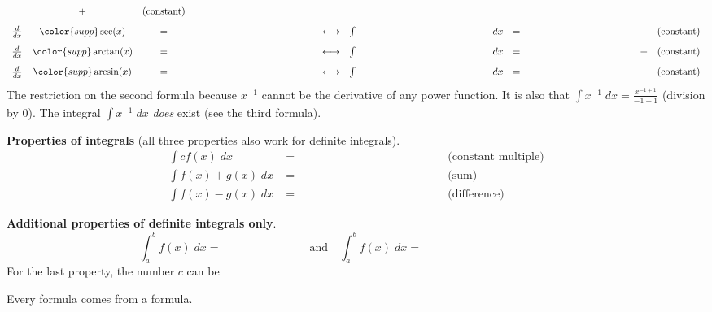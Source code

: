 \documentclass[../main.tex]{subfiles}
\begin{document}
\[\begin{array}{rcclcrclllcl}
                 &+& (\text{constant}) \\[2ex]
    \frac{d}{dx} & {\color{supp} \sec(x)} &=& \phantom{\color{main} \tan(x)\sec(x)}
                 & \longleftrightarrow 
                 & \int & \phantom{\color{main} \tan(x)\sec(x)} & dx &=& \phantom{\color{supp} \sec(x)} 
                 &+& (\text{constant}) \\[2ex]
    \frac{d}{dx} & {\color{supp} \arctan(x)} &=& \phantom{\color{main} \frac{1}{x^{2}+1}}
                 & \longleftrightarrow 
                 & \int & \phantom{\color{main} \frac{1}{x^{2} + 1}} & dx &=& \phantom{\color{supp} \arctan(x)} 
                 &+& (\text{constant}) \\[2ex]
    \frac{d}{dx} & {\color{supp} \arcsin(x)} &=& \phantom{\color{main} \frac{1}{\sqrt{1 - x^{2}}}}
                 & \longleftrightarrow 
                 & \int & \phantom{\color{main} \frac{1}{\sqrt{1 - x^{2}}}} & dx &=& \phantom{\color{supp} \arcsin(x)} 
                 &+& (\text{constant})
  \end{array}
\]
{\footnotesize \faExclamationTriangle{} The restriction  on the second formula  because \(x^{-1}\) cannot be the derivative of any power function. It is also  that \(\textstyle \int x^{-1} \;dx = \frac{x^{-1 + 1}}{-1 + 1}\) (division by \(0\)). The integral \(\textstyle \int x^{-1} \;dx\) \emph{does} exist (see the third formula).}

\textbf{Properties of integrals} (all three properties also work for definite integrals).
\begin{align*}
  \int c f(x) \;dx 
    &= \phantom{c \int f(x) \;dx} && \text{(constant multiple)}\\
    \int f(x) + g(x) \;dx 
    &= \phantom{\int f(x) \;dx + \int g(x) \;dx} && \text{(sum)}\\
    \int f(x) - g(x) \;dx 
    &= \phantom{\int f(x) \;dx - \int g(x) \;dx} && \text{(difference)}
\end{align*}

\textbf{Additional properties of definite integrals only}.
\[
  \int_{a}^{b} f(x) \;dx = \phantom{- \int_{b}^{a} f(x) \;dx}
  \quad\text{and}\quad
  \int_{a}^{b} f(x) \;dx = \phantom{\int_{a}^{c} f(x) \;dx + \int_{c}^{b} f(x) \;dx.}
\]
For the last property, the number \(c\) can be \underline{\hspace{4in}}
\clearpage

Every  formula comes from a  formula.
\end{document}
